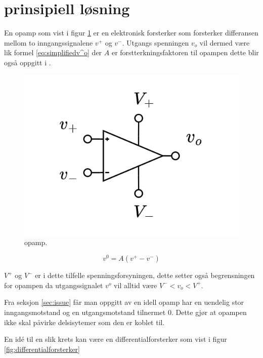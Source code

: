 \section{prinsipiell løsning}
\label{sec:concept}

En opamp som vist i figur \ref{fig:02opamp} er en elektronisk forsterker som forsterker differansen mellom to inngangssignalene $v^+$ og $v^-$. Utgangs spenningen $v_o$ vil dermed være lik formel \ref{eq:simplifiedv^o} der $A$ er forstterkningsfaktoren til opampen dette blir også oppgitt i \cite{wikipediacontributors_2021_differential}. 

\begin{figure}[!hbt]
	\centering
	\includegraphics[scale=0.3]{./Images/02Concept/opamp.png}
	\caption{opamp.}
	\label{fig:02opamp}
\end{figure}

\begin{equation}
    v^0 = A(v^+ - v^-)
    \label{eq:simplifiedv^o}
\end{equation}

$V^+$ og $V^-$ er i dette tilfelle spenningsforsyningen, dette setter også begrensningen for opampen da utgangssignalet $v^o$ vil alltid være $V^- < v_o < V^+$.

Fra seksjon \ref{sec:issue} får man oppgitt av en idell opamp har en uendelig stor inngangsmotstand og en utgangsmotstand tilnermet 0. Dette gjør at opampen ikke skal påvirke delsisytemer som den er koblet til. 

En idé til en slik krets kan være en differentialforsterker som vist i figur \ref{fig:differentialforsterker}


